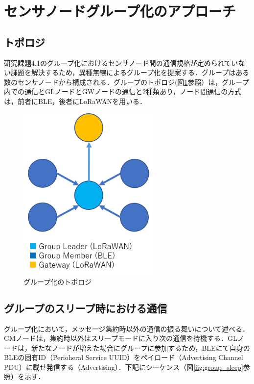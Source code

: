 \section{センサノードグループ化のアプローチ}

\subsection{トポロジ}
研究課題4.1のグループ化におけるセンサノード間の通信規格が定められていない課題を解決するため，異種無線によるグループ化を提案する．グループはある数のセンサノードから構成される．グループのトポロジ(図\ref{fig:group_topology}参照）は，グループ内での通信とGLノードとGWノードの通信と2種類あり，ノード間通信の方式は，前者にBLE，後者にLoRaWANを用いる．

\begin{figure}[]
    \begin{center}
    \includegraphics[width=7cm]{figures/v2.0/トポロジ.png}
    \caption{グループ化のトポロジ}
    \label{fig:group_topology}
    \end{center}
\end{figure}

\subsection{グループのスリープ時における通信}
グループ化において，メッセージ集約時以外の通信の振る舞いについて述べる．GMノードは，集約時以外はスリープモードに入り次の通信を待機する．GLノードは，新たなノードが増えた場合にグループに参加するため，BLEにて自身のBLEの固有ID（Perioheral Service UUID）をペイロード（Advertising Channel PDU）に載せ発信する（Advertising）．下記にシーケンス（図\ref{fig:group_sleep}参照）を示す．

